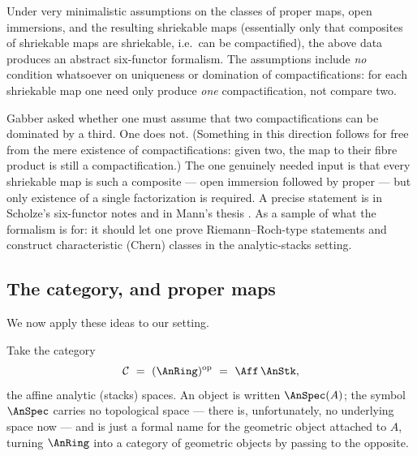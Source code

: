 \begin{theorem}
\label{thm:16:liu-zheng-mann}
Under very minimalistic assumptions on the classes of proper maps, open immersions,
and the resulting shriekable maps (essentially only that composites of shriekable maps
are shriekable, i.e.\ can be compactified), the above data produces an abstract
six-functor formalism. The assumptions include \emph{no} condition whatsoever on
uniqueness or domination of compactifications: for each shriekable map one need only
produce \emph{one} compactification, not compare two.
\end{theorem}

\begin{remark}
\label{rmk:16:no-uniqueness}
Gabber asked whether one must assume that two compactifications can be dominated by a
third. One does not. (Something in this direction follows for free from the mere
existence of compactifications: given two, the map to their fibre product is still a
compactification.) The one genuinely needed input is that every shriekable map is such
a composite --- open immersion followed by proper --- but only existence of a single
factorization is required. A precise statement is in Scholze's six-functor notes
\cite{scholze2023six} and in Mann's thesis \cite{mann2022padic6functorformalismrigidanalytic}.
As a sample of what the formalism is for: it should let one prove Riemann--Roch-type
statements and construct characteristic (Chern) classes in the analytic-stacks setting.
\end{remark}

\subsection{The category, and proper maps}
\label{subsec:16:proper}

We now apply these ideas to our setting.

\begin{notation}
\label{not:16:aff-anstk}
Take the category
\begin{equation*}
\mathcal C\ =\ (\AnRing)^{\mathrm{op}}\ =\ \Aff\,\AnStk,
\end{equation*}
the affine analytic (stacks) spaces. An object is written $\AnSpec(A)$; the symbol
$\AnSpec$ carries no topological space --- there is, unfortunately, no underlying
space now --- and is just a formal name for the geometric object attached to $A$,
turning $\AnRing$ into a category of geometric objects by passing to the opposite.
\end{notation}


